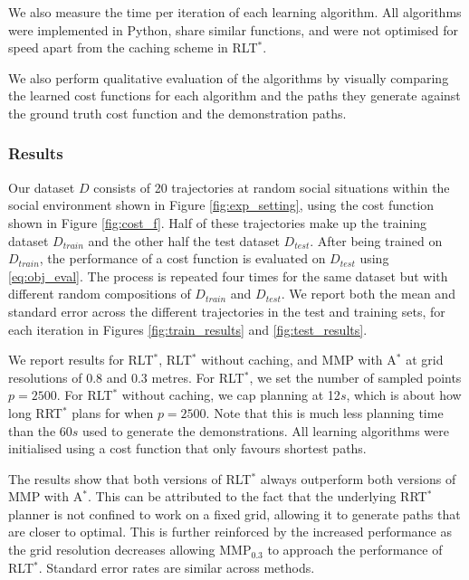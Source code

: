 \documentclass[a4paper,11pt]{report}
\begin{document}
We also measure the time per iteration of each learning algorithm.  All algorithms were implemented in Python, share similar functions, and were not optimised for speed apart from the caching scheme in RLT$^*$.

	We also perform qualitative evaluation of the algorithms by visually comparing the learned cost functions for each algorithm and the paths they generate against the ground truth cost function and the demonstration paths.

	\subsubsection{Results}

	Our dataset $D$ consists of 20 trajectories at random social situations within the social environment shown in Figure \ref{fig:exp_setting}, using the cost function shown in Figure \ref{fig:cost_f}. Half of these trajectories make up the training dataset $D_{train}$ and the other half the test dataset $D_{test}$. After being trained on $D_{train}$, the performance of a cost function is evaluated on $D_{test}$ using \eqref{eq:obj_eval}. The process is repeated four times for the same dataset but with different random compositions of $D_{train}$ and $D_{test}$. We report both the mean and standard error across the different trajectories in the test and training sets, for each iteration in Figures \ref{fig:train_results} and \ref{fig:test_results}. 

We report results for RLT$^*$, RLT$^*$ without caching, and MMP with A$^*$ at grid resolutions of 0.8 and 0.3 metres.  For RLT$^*$, we set the number of sampled points $p=2500$. For RLT$^*$ without 
caching, we cap planning at 12$s$, which is about how long RRT$^*$ plans for when $p=2500$.  Note 
that this is much less planning time than the 60$s$ used to generate the demonstrations.
 All learning algorithms were initialised using a cost function that only favours shortest paths.

The results show that both versions of RLT$^*$ always outperform both versions of MMP with A$^*$. This can be attributed to the fact that the underlying RRT$^*$ planner is not confined to work on a fixed grid, allowing it to generate paths that are closer to optimal. This is further reinforced by the increased performance as the grid resolution decreases allowing MMP$_{0.3}$ to approach the performance of RLT$^*$. Standard error rates are similar across methods.
\end{document}

